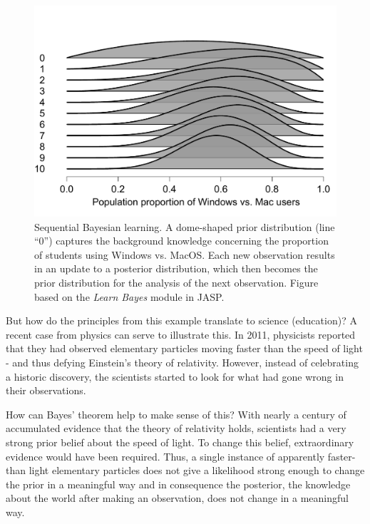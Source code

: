 \documentclass[man]{apa7}
\begin{document}
\begin{figure}[h]
\begin{center}
\includegraphics[width = .65\paperwidth]{WindowsMacSequential.pdf}
\caption{Sequential Bayesian learning. A dome-shaped prior distribution (line ``0'') captures the background knowledge concerning the proportion of students using Windows vs. MacOS. Each new observation results in an update to a posterior distribution, which then becomes the prior distribution for the analysis of the next observation. Figure based on the \emph{Learn Bayes} module in JASP.}
\label{fig:WindowsMacSequential}
\end{center}
\end{figure}

But how do the principles from this example translate to science (education)? A recent case from physics can serve to illustrate this. In 2011, physicists reported that they had observed elementary particles moving faster than the speed of light \parencite{b11} - and thus defying Einstein’s theory of relativity. However, instead of celebrating a historic discovery, the scientists started to look for what had gone wrong in their observations. 

How can Bayes’ theorem help to make sense of this? With nearly a century of accumulated evidence that the theory of relativity holds, scientists had a very strong prior belief about the speed of light. To change this belief, extraordinary evidence would have been required. Thus, a single instance of apparently faster-than light elementary particles does not give a likelihood strong enough to change the prior in a meaningful way and in consequence the posterior, the knowledge about the world after making an observation, does not change in a meaningful way. 
\end{document}
